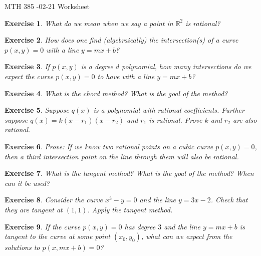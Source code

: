 \documentclass[12pt]{article}
\theoremstyle{plain}
\newtheorem{ex}{Exercise}
\begin{document}
MTH 385 -02-21 Worksheet

\begin{ex}
  What do we mean when we say a point in $\mathbb{R}^2$ is \emph{rational}?
\end{ex}

\begin{ex}
  How does one find (algebraically) the intersection(s) of a curve $p(x,y)=0$ with a line $y=mx+b$?
\end{ex}

\begin{ex}
  If $p(x,y)$ is a degree $d$ polynomial, how many intersections do we expect the curve $p(x,y)=0$ to have with a line $y=mx+b$?
\end{ex}

\begin{ex}
  What is the \emph{chord method}? What is the goal of the method?
\end{ex}

\begin{ex}
  Suppose $q(x)$ is a polynomial with rational coefficients. Further suppose $q(x)=k(x-r_1)(x-r_2)$ and $r_1$ is rational. Prove $k$ and $r_2$ are also rational.
\end{ex}

\begin{ex}
  Prove: If we know two rational points on a cubic curve $p(x,y)=0$, then a third intersection point on the line through them will also be rational.
\end{ex}

\begin{ex}
  What is the \emph{tangent method}? What is the goal of the method? When can it be used?
\end{ex}

\begin{ex}
  Consider the curve $x^3-y=0$ and the line $y=3x-2$. Check that they are tangent at $(1,1)$. Apply the tangent method.
\end{ex}

\begin{ex}
  If the curve $p(x,y)=0$ has degree $3$ and the line $y=mx+b$ is tangent to the curve at some point $(x_0,y_0)$, what can we expect from the solutions to $p(x,mx+b)=0$?
\end{ex}
\end{document}
